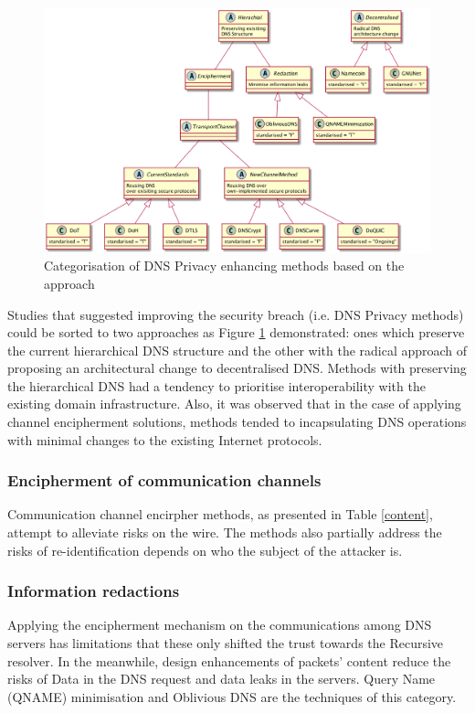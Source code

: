 \begin{figure}[h!]
    \begin{center}
    \includegraphics*[width=1\columnwidth]{img/dnsprivacy-classification}
    \end{center}
    \caption{Categorisation of DNS Privacy enhancing methods based on the approach}
    \label{dns-methods-classification}
\end{figure}

Studies that suggested improving the security breach (i.e. DNS Privacy methods) could be sorted to two approaches as Figure \ref{dns-methods-classification} demonstrated: ones which preserve the current hierarchical DNS structure and the other with the radical approach of proposing an architectural change to decentralised DNS.
Methods with preserving the hierarchical DNS had a tendency to prioritise interoperability with the existing domain infrastructure. Also, it was observed that in the case of applying channel encipherment solutions, methods tended to incapsulating DNS operations with minimal changes to the existing Internet protocols.

\subsubsection{Encipherment of communication channels}
Communication channel encirpher methods, as presented in Table \ref{content}, attempt to alleviate risks on the wire.
The methods also partially address the risks of re-identification depends on who the subject of the attacker is.

\subsubsection{Information redactions}
Applying the encipherment mechanism on the communications among DNS servers has limitations that these only shifted the trust towards the Recursive resolver.
In the meanwhile, design enhancements of packets' content reduce the risks of Data in the DNS request and data leaks in the servers.
Query Name (QNAME) minimisation \cite{bortzmeyer2016dns} and Oblivious DNS \cite{annee-dprive-oblivious-dns-00} are the techniques of this category.

